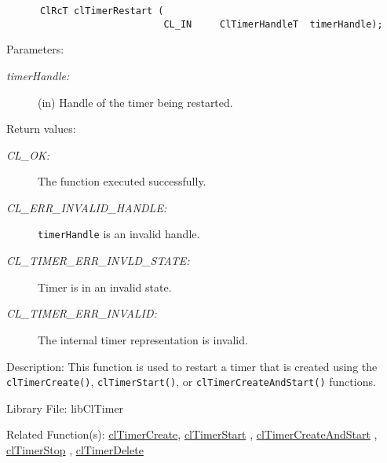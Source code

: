 \begin{flushleft}
\begin{Desc}
\footnotesize\begin{verbatim}      ClRcT clTimerRestart (
            				CL_IN     ClTimerHandleT  timerHandle);
\end{verbatim}
\normalsize
\end{Desc}
\begin{Desc}
\item[Parameters:]
\begin{description}
\item[{\em timer\-Handle:}](in) Handle of the timer being restarted.\end{description}
\end{Desc}
\begin{Desc}
\item[Return values:]
\begin{description}
\item[{\em CL\_\-OK:}]The function executed successfully. 
\item[{\em CL\_\-ERR\_\-INVALID\_\-HANDLE:}]{\tt{timerHandle}} is an invalid handle. 
\item[{\em CL\_\-TIMER\_\-ERR\_\-INVLD\_\-STATE:}]Timer is in an invalid state. 
\item[{\em CL\_\-TIMER\_\-ERR\_\-INVALID:}]The internal timer representation is invalid.\end{description}
\end{Desc}
\begin{Desc}
\item[Description:]This function is used to restart a timer that is created using the {\tt{clTimerCreate()}}, {\tt{clTimerStart()}}, or 
{\tt{clTimerCreateAndStart()}} functions. \end{Desc}
\begin{Desc}
\item[Library File:]lib\-Cl\-Timer\end{Desc}
\begin{Desc}
\item[Related Function(s):]\hyperlink{group__group33}{cl\-Timer\-Create}, \hyperlink{group__group33}{cl\-Timer\-Start} , \hyperlink{group__group33}{cl\-Timer\-Create\-And\-Start} , \hyperlink{group__group33}{cl\-Timer\-Stop} , \hyperlink{group__group33}{cl\-Timer\-Delete} \end{Desc}
\newpage



\end{flushleft}
